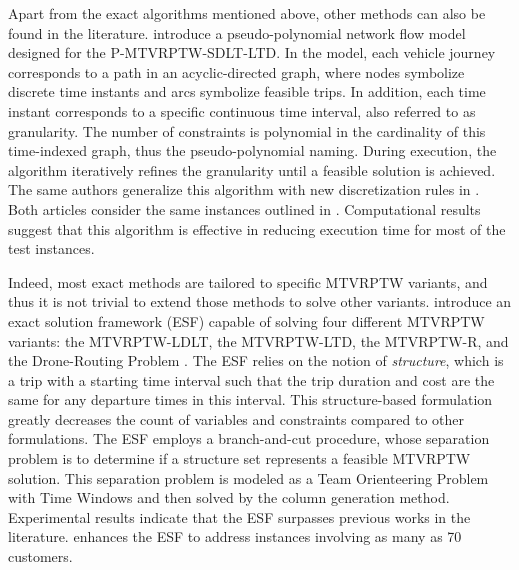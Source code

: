 \documentclass[11pt]{article}
\begin{document}
Apart from the exact algorithms mentioned above, other methods can also be found in the literature.  \cite{macedo2011solving} introduce a pseudo-polynomial network flow model designed for the P-MTVRPTW-SDLT-LTD.  In the model, each vehicle journey corresponds to a path in an acyclic-directed graph, where nodes symbolize discrete time instants and arcs symbolize feasible trips.  In addition, each time instant corresponds to a specific continuous time interval, also referred to as granularity.  The number of constraints is polynomial in the cardinality of this time-indexed graph, thus the pseudo-polynomial naming.  During execution, the algorithm iteratively refines the granularity until a feasible solution is achieved.  The same authors generalize this algorithm with new discretization rules in \cite{macedo2012generalized}.  Both articles consider the same instances outlined in \cite{azi2010exact}.  Computational results suggest that this algorithm is effective in reducing execution time for most of the test instances.
\newline

Indeed, most exact methods are tailored to specific MTVRPTW variants, and thus it is not trivial to extend those methods to solve other variants.  \cite{paradiso2020exact} introduce an exact solution framework (ESF) capable of solving four different MTVRPTW variants: the MTVRPTW-LDLT, the MTVRPTW-LTD, the MTVRPTW-R, and the Drone-Routing Problem \citep[e.g.,][]{cheng2018formulations}.  The ESF relies on the notion of \textit{structure}, which is a trip with a starting time interval such that the trip duration and cost are the same for any departure times in this interval.  This structure-based formulation greatly decreases the count of variables and constraints compared to other formulations.  The ESF employs a branch-and-cut procedure, whose separation problem is to determine if a structure set represents a feasible MTVRPTW solution.  This separation problem is modeled as a Team Orienteering Problem with Time Windows \citep[see, e.g.,][]{vansteenwegen2009iterated} and then solved by the column generation method.  Experimental results indicate that the ESF surpasses previous works in the literature.  \cite{yang2023exact} enhances the ESF \citep{paradiso2020exact} to address instances involving as many as 70 customers.
\newline
\end{document}
